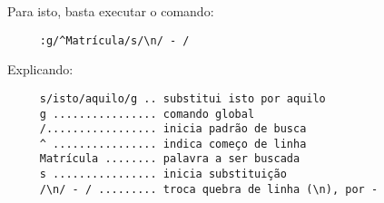 Para isto, basta executar o comando:

\begin{verbatim}
     :g/^Matrícula/s/\n/ - /
\end{verbatim}

Explicando:

\begin{verbatim}
     s/isto/aquilo/g .. substitui isto por aquilo
     g ................ comando global
     /................. inicia padrão de busca
     ^ ................ indica começo de linha
     Matrícula ........ palavra a ser buscada
     s ................ inicia substituição
     /\n/ - / ......... troca quebra de linha (\n), por -
\end{verbatim}
